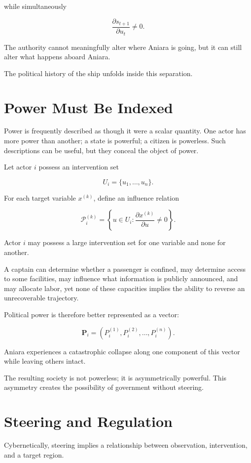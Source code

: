 \documentclass[11pt,oneside]{book}
\theoremstyle{definition}
\theoremstyle{remark}
\begin{document}
while simultaneously

\[
\frac{\partial s_{t+1}}{\partial u_t}\neq0.
\]

The authority cannot meaningfully alter where Aniara is going, but it can still alter what happens aboard Aniara.

The political history of the ship unfolds inside this separation.

\section{Power Must Be Indexed}

Power is frequently described as though it were a scalar quantity. One actor has more power than another; a state is powerful; a citizen is powerless. Such descriptions can be useful, but they conceal the object of power.

Let actor \(i\) possess an intervention set

\[
U_i=\{u_1,\ldots,u_n\}.
\]

For each target variable \(x^{(k)}\), define an influence relation

\[
\mathcal P_i^{(k)}
=
\left\{
u\in U_i:
\frac{\partial x^{(k)}}{\partial u}\neq0
\right\}.
\]

Actor \(i\) may possess a large intervention set for one variable and none for another.

A captain can determine whether a passenger is confined, may determine access to some facilities, may influence what information is publicly announced, and may allocate labor, yet none of these capacities implies the ability to reverse an unrecoverable trajectory.

Political power is therefore better represented as a vector:

\[
\mathbf P_i
=
\left(
P_i^{(1)},
P_i^{(2)},
\ldots,
P_i^{(n)}
\right).
\]

Aniara experiences a catastrophic collapse along one component of this vector while leaving others intact.

The resulting society is not powerless; it is asymmetrically powerful. This asymmetry creates the possibility of government without steering.

\section{Steering and Regulation}

Cybernetically, steering implies a relationship between observation, intervention, and a target region.
\end{document}
